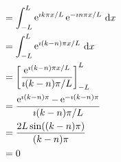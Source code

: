 {\begin{Solution}
\begin{enumerate}
\begin{align*}
      &= \int_{-L}^L \mathop{\mathrm{e}}\nolimits^{\imath k \pi x / L} \mathop{\mathrm{e}}\nolimits^{-\imath n \pi x / L} \,\mathrm{d} x \\
      &= \int_{-L}^L \mathop{\mathrm{e}}\nolimits^{\imath (k-n) \pi x / L} \,\mathrm{d} x \\
      &= \left[ \frac{ \mathop{\mathrm{e}}\nolimits^{\imath (k-n) \pi x / L} }{ \imath (k-n) \pi / L } 
      \right]_{-L}^L \\
      &= \frac{ \mathop{\mathrm{e}}\nolimits^{\imath (k-n) \pi} - \mathop{\mathrm{e}}\nolimits^{-\imath (k-n) \pi} }{ \imath (k-n) \pi / L } \\
      &= \frac{ 2 L \sin((k-n)\pi) }{ (k-n) \pi } \\
      &= 0
    \end{align*}
  \end{enumerate}
\end{Solution}





\raggedbottom

}

